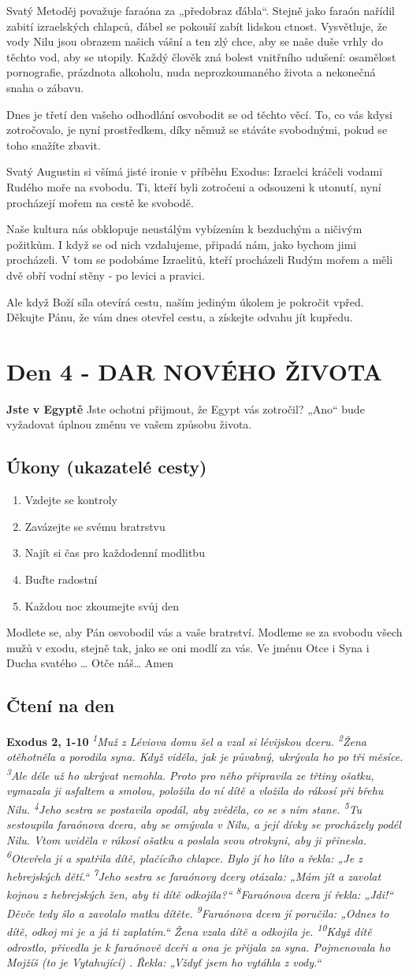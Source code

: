 \documentclass[11pt]{article}
\newcommand{\zacatekPrvniTyden}{
  \textbf{Jste v Egyptě} \newline
  Jste ochotni přijmout, že Egypt vás zotročil? „Ano“ bude vyžadovat úplnou změnu ve vašem způsobu života.

\subsection*{Úkony (ukazatelé cesty)}
\begin{enumerate}
  \item Vzdejte se kontroly
  \item Zavázejte se svému bratrstvu
  \item Najít si čas pro každodenní modlitbu
  \item Buďte radostní
  \item Každou noc zkoumejte svůj den
\end{enumerate}
Modlete se, aby Pán osvobodil vás a vaše bratrství. \newline
Modleme se za svobodu všech mužů v exodu, stejně tak, jako se oni modlí za vás.\newline
Ve jménu Otce i Syna i Ducha svatého …  Otče náš… Amen
}
\begin{document}
Svatý Metoděj považuje faraóna za „předobraz ďábla“. Stejně jako faraón nařídil zabití izraelských chlapců, ďábel se pokouší zabít lidskou ctnost. Vysvětluje, že vody Nilu jsou obrazem našich vášní a ten zlý chce, aby se naše duše vrhly do těchto vod, aby se utopily. Každý člověk zná bolest vnitřního udušení: osamělost pornografie, prázdnota alkoholu, nuda neprozkoumaného života a nekonečná snaha o zábavu.

Dnes je třetí den vašeho odhodlání osvobodit se od těchto věcí. To, co vás kdysi zotročovalo, je nyní prostředkem, díky němuž se stáváte svobodnými, pokud se toho snažíte zbavit.

Svatý Augustin si všímá jisté ironie v příběhu Exodus: Izraelci kráčeli vodami Rudého moře na svobodu. Ti, kteří byli zotročeni a odsouzeni k utonutí, nyní procházejí mořem na cestě ke svobodě.

Naše kultura nás obklopuje neustálým vybízením k bezduchým a ničivým požitkům. I když se od nich vzdalujeme, připadá nám, jako bychom jimi procházeli. V tom se podobáme Izraelitů, kteří procházeli Rudým mořem a měli dvě obří vodní stěny - po levici a pravici.

Ale když Boží síla otevírá cestu, naším jediným úkolem je pokročit vpřed.
Děkujte Pánu, že vám dnes otevřel cestu, a získejte odvahu jít kupředu.


\newpage
\section{Den 4 - DAR NOVÉHO ŽIVOTA}
\zacatekPrvniTyden
\subsection*{Čtení na den}
\textbf{Exodus 2, 1-10}
\newline
\textit{
\textsuperscript{1}Muž z Léviova domu šel a vzal si lévijskou dceru.
\textsuperscript{2}Žena otěhotněla a porodila syna. Když viděla, jak je půvabný, ukrývala ho po tři měsíce.
\textsuperscript{3}Ale déle už ho ukrývat nemohla. Proto pro něho připravila ze třtiny ošatku, vymazala ji asfaltem a smolou, položila do ní dítě a vložila do rákosí při břehu Nilu.
\textsuperscript{4}Jeho sestra se postavila opodál, aby zvěděla, co se s ním stane.
\textsuperscript{5}Tu sestoupila faraónova dcera, aby se omývala v Nilu, a její dívky se procházely podél Nilu. Vtom uviděla v rákosí ošatku a poslala svou otrokyni, aby ji přinesla.
\textsuperscript{6}Otevřela ji a spatřila dítě, plačícího chlapce. Bylo jí ho líto a řekla: „Je z hebrejských dětí.“
\textsuperscript{7}Jeho sestra se faraónovy dcery otázala: „Mám jít a zavolat kojnou z hebrejských žen, aby ti dítě odkojila?“
\textsuperscript{8}Faraónova dcera jí řekla: „Jdi!“ Děvče tedy šlo a zavolalo matku dítěte.
\textsuperscript{9}Faraónova dcera jí poručila: „Odnes to dítě, odkoj mi je a já ti zaplatím.“ Žena vzala dítě a odkojila je.
\textsuperscript{10}Když dítě odrostlo, přivedla je k faraónově dceři a ona je přijala za syna. Pojmenovala ho Mojžíš (to je Vytahující) . Řekla: „Vždyť jsem ho vytáhla z vody.“}
\end{document}
